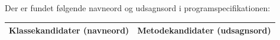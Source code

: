 \documentclass[a4paper,12pt]{report}
\begin{document}
Der er fundet følgende navneord og udsagnsord i programspecifikationen:\\
\begin{table}[H]
\begin{tabular}{ll}
\hline
\textbf{Klassekandidater (navneord)}                                                                                                                                                                                                                                                                                                                                        & \textbf{Metodekandidater (udsagnsord)}                                                                                                                                                                                                                    \\ \hline

\end{tabular}
\end{table}
\end{document}
